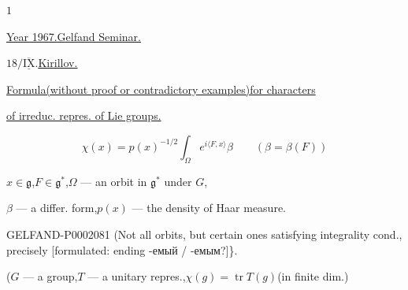 \begin{flushright}$1$\end{flushright}



\underline{\underline{Year 1967.}}\qquad\underline{Gelfand Seminar.}



$18/\overline{\underline{\mathrm{IX}}}$.\quad\underline{\underline{Kirillov.}}



\underline{Formula}\quad\underline{(without proof or contradictory examples)}\quad\underline{for characters}
\par\underline{of irreduc. repres. of Lie groups.}



\begin{equation*}\chi (x)=p (x)^{-1/2}\int_{\Omega}e^{i\langle F, x\rangle}\beta\qquad (\beta=\beta (F))\end{equation*}



$x\in\mathfrak g$,\quad$F\in\mathfrak g^*$,\quad$\Omega$ --- an orbit in $\mathfrak g^*$ under $G$,
\par$\beta$ --- a differ. form,\quad$p (x)$ --- the density of Haar measure.



\begin{GelfandAdjacentEvidence}{GELFAND-P000208}{1}
(Not all orbits, but certain ones satisfying integrality cond., precisely [formulated: ending -емый / -емым?]\}.
\end{GelfandAdjacentEvidence}

($G$ --- a group,\quad$T$ --- a unitary repres.,\quad$\chi (g)=\operatorname{tr}T (g)$\quad (in finite dim.)



